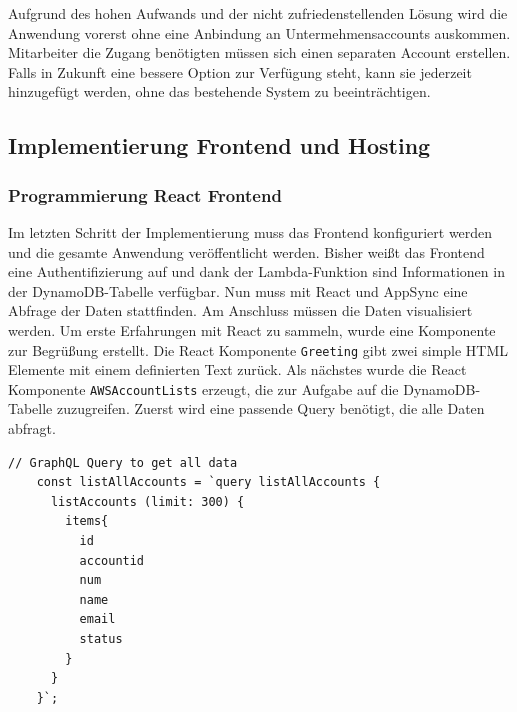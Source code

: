 Aufgrund des hohen Aufwands und der nicht zufriedenstellenden Lösung wird die Anwendung vorerst ohne eine Anbindung an Untermehmensaccounts auskommen.
Mitarbeiter die Zugang benötigten müssen sich einen separaten Account erstellen.
Falls in Zukunft eine bessere Option zur Verfügung steht, kann sie jederzeit hinzugefügt werden, ohne das bestehende System zu beeinträchtigen.


\subsection{Implementierung Frontend und Hosting}

\subsubsection{Programmierung React Frontend}
\label{ReactFrontend}
Im letzten Schritt der Implementierung muss das Frontend konfiguriert werden und die gesamte Anwendung veröffentlicht werden.
Bisher weißt das Frontend eine Authentifizierung auf und dank der Lambda-Funktion sind Informationen in der DynamoDB-Tabelle verfügbar.
Nun muss mit React und AppSync eine Abfrage der Daten stattfinden.
Am Anschluss müssen die Daten visualisiert werden.
Um erste Erfahrungen mit React zu sammeln, wurde eine Komponente zur Begrüßung erstellt.
Die React Komponente \verb+Greeting+ gibt zwei simple HTML Elemente mit einem definierten Text zurück.
Als nächstes wurde die React Komponente \verb+AWSAccountLists+ erzeugt, die zur Aufgabe auf die DynamoDB-Tabelle zuzugreifen.
Zuerst wird eine passende Query benötigt, die alle Daten abfragt.
\begin{lstlisting}[basicstyle=\ttfamily\small, breaklines=true , frame = single, backgroundcolor=\color{lavender} ]
    // GraphQL Query to get all data
    const listAllAccounts = `query listAllAccounts {
      listAccounts (limit: 300) {
        items{
          id
          accountid
          num
          name
          email
          status
        }
      }
    }`;
    \end{lstlisting}



